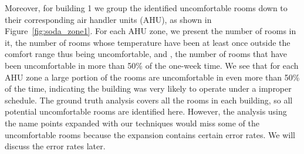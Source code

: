 Moreover, for building 1 we group the identified uncomfortable rooms down to their corresponding air handler units (AHU), as shown in Figure~\ref{fig:soda_zone1}. For each AHU zone, we present the number of rooms in it, the number of rooms whose temperature have been at least once outside the comfort range thus being uncomfortable, and , the number of rooms that have been uncomfortable in more than 50\% of the one-week time. We see that for each AHU zone a large portion of the rooms are uncomfortable in even more than 50\% of the time, indicating the building was very likely to operate under a improper schedule. The ground truth analysis covers all the rooms in each building, so all potential uncomfortable rooms are identified here. However, the analysis using the name points expanded with our techniques would miss some of the uncomfortable rooms because the expansion contains certain error rates. We will discuss the error rates later.

